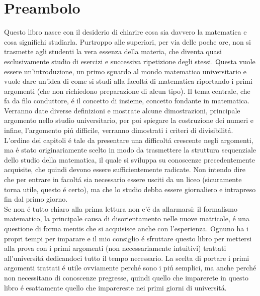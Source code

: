 \documentclass[twoside]{article} %
\newcommand{\blankpage}{\null\thispagestyle{empty}\addtocounter{page}{-1}\newpage}
\begin{document}
	\section*{Preambolo}
	Questo libro nasce con il desiderio di chiarire cosa sia davvero la matematica e cosa significhi studiarla. Purtroppo alle superiori, per via delle poche ore, non si trasmette agli studenti la vera essenza della materia, che diventa quasi esclusivamente studio di esercizi e successiva ripetizione degli stessi. Questa vuole essere un'introduzione, un primo sguardo al mondo matematico universitario e vuole dare un'idea di come si studi alla facolt\'a di matematica riportando i primi argomenti (che non richiedono preparazione di alcun tipo). Il tema centrale, che fa da filo conduttore, \'e il concetto di insieme, concetto fondante in matematica. Verranno date diverse definizioni e mostrate alcune dimostrazioni, principale argomento nello studio universitario, per poi spiegare la costruzione dei numeri e infine, l'argomento pi\'u difficile, verranno dimostrati i criteri di divisibilit\'a.\\
	L'ordine dei capitoli \'e tale da presentare una difficolt\'a crescente negli argomenti, ma \'e stato originariamente scelto in modo da trasmettere la struttura sequenziale dello studio della matematica, il quale si sviluppa su conoscenze precedentemente acquisite, che quindi devono essere sufficientemente radicate. Non intendo dire che per entrare in facolt\'a sia necessario essere usciti da un liceo (sicuramente torna utile, questo \'e certo), ma che lo studio debba essere giornaliero e intrapreso fin dal primo giorno.\\
	Se non \'e tutto chiaro alla prima lettura non c'\'e da allarmarsi: il formalismo matematico, la principale causa di disorientamento nelle nuove matricole, \'e una questione di forma mentis che si acquisisce anche con l'esperienza. Ognuno ha i propri tempi per imparare e il mio consiglio \'e sfruttare questo libro per mettersi alla prova con i primi argomenti (non necessariamente intuitivi) trattati all'universit\'a dedicandoci tutto il tempo necessario. La scelta di portare i primi argomenti trattati \'e utile ovviamente perch\'e sono i pi\'u semplici, ma anche perch\'e non necessitano di conoscenze pregresse, quindi quello che imparerete in questo libro \'e esattamente quello che imparereste nei primi giorni di universit\'a.	

	\thispagestyle{preambolo}%
	\afterpage{\blankpage}%
	
\end{document}
